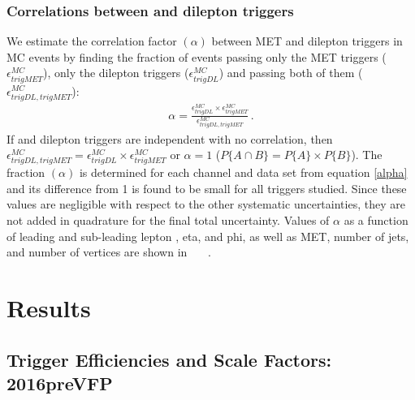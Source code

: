 {\subsubsection{Correlations between \MET and dilepton triggers}
We estimate the correlation factor $(\alpha)$ between MET and dilepton triggers in \ttbar MC events by finding the fraction of events passing only the MET triggers ($\epsilon_{trigMET}^{MC}$), only the dilepton triggers ($\epsilon_{trigDL}^{MC}$) and passing both of them ($\epsilon_{trigDL,trigMET}^{MC}$): 
\begin{eqnarray}
\alpha=\frac{\epsilon_{trigDL}^{MC} \times \epsilon_{trigMET}^{MC}}{\epsilon_{trigDL,trigMET}^{MC}} \, .
\label{alpha}
\end{eqnarray}
If \MET and dilepton triggers are independent with no correlation, then $\epsilon_{trigDL,trigMET}^{MC} = \epsilon_{trigDL}^{MC} \times \epsilon_{trigMET}^{MC}$ or $\alpha = 1$ ($P\{A\cap B\} = P\{A\} \times P\{B\}$).
The fraction $(\alpha)$ is determined for each channel and data set from equation \ref{alpha} and its difference from 1 is found to be small for all triggers studied. 
Since these values are negligible with respect to the other systematic uncertainties, they are not added in quadrature for the final total uncertainty. 
Values of $\alpha$ as a function of leading and sub-leading lepton \pT, eta, and phi, as well as MET, number of jets, and number of vertices are shown in ~~~. 

\newpage
\section{Results}

\subsection{Trigger Efficiencies and Scale Factors: 2016preVFP}
\label{TrigSFResults2016preVFP}

}
